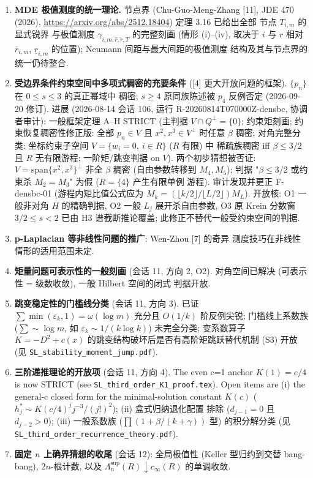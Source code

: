 \documentclass[UTF8]{ctexart}
\begin{document}
\begin{enumerate}
		$q\ge0$ (Gan-Zheng-Li-Shao 线 [8]) 与变号权重的最优常数与极值
		结构仍待确定.
	\item \textbf{MDE 极值测度的统一理论.}
		节点界 (Chu-Guo-Meng-Zhang [11], JDE 470 (2026),
		\url{https://arxiv.org/abs/2512.18404}) 定理 3.16 已给出全部
		节点 $T_{i,m}$ 的显式锐界
		与极值测度 $\gamma_{i,m,\hat r,\check r,T}$ 的完整刻画
		(情形 (i)--(iv), 取决于 $i$ 与 $r$ 相对 $\overline r_{i,m}$,
		$\underline r_{i,m}$ 的位置); Neumann 间距与最大间距的极值测度
		结构及其与节点界的统一仍待整合.
	\item \textbf{受边界条件约束空间中多项式稠密的充要条件}
		([4] 更大开放问题的框架). $\{p_n\}$ 在 $0\le s\le3$ 的真正幂域中
		稠密; $s\ge4$ 原同族陈述被 $p_4$ 反例否定 (2026-09-20 修订). 进展 (2026-08-14 会话 106, 运行
		R-20260814T070000Z-densbc, 协调者审计): 一般框架定理 A--H STRICT
		(主判据 $V\cap Q^\perp=\{0\}$; 约束矩刻画; 约束恢复稠密性修正版:
		全部 $p_n\in V$ 且 $x^2,x^3\in V^\perp$ 时任意 $\beta$ 稠密;
		对角完整分类: 坐标约束子空间 $V=\{w_i=0,\ i\in R\}$ ($R$ 有限) 中
		稀疏族稠密 iff $\beta\le3/2$ 且 $R$ 无有限游程; 一阶矩/跳变判据
		on $V$). 两个初步猜想被否证: $V=\mathrm{span}\{x^2,x^3\}^\perp$
		非全 $\beta$ 稠密 (自由参数转移到 $M_4,M_5$); 判据
		"$\beta\le3/2$ 或约束杀 $M_2=M_3$" 为假 ($R=\{4\}$ 产生有限单例
		游程). 审计发现并更正 F-densbc-01 (游程内矩比值公式应为
		$M_k=(\lfloor k/2\rfloor/\lfloor L/2\rfloor)M_L$). 开放核:
		O1 一般非对角 $H$ 的精确判据, O2 一般 $L_j$ 展开杀自由参数,
		O3 原 Krein 分数窗 $3/2\le s<2$ 已由 H3 谱截断推论覆盖; 此修正不替代一般受约束空间的判据.
	\item \textbf{p-Laplacian 等非线性问题的推广}: Wen-Zhou [7] 的奇异
		测度技巧在非线性情形的适用范围未定.
	\item \textbf{矩量问题可表示性的一般刻画} (会话 11, 方向 2, O2).
		对角空间已解决 (可表示性 = 级数收敛), 一般 Hilbert 空间的闭式
		判据开放.
	\item \textbf{跳变稳定性的门槛线分类} (会话 11, 方向 3).
		已证 $\sum\min(\varepsilon_k,1) = \omega(\log m)$ 充分且 $O(1/k)$
		阶反例尖锐; 门槛线上系数族 ($\sum\sim\log m$, 如
		$\varepsilon_k\sim1/(k\log k)$) 未完全分类; 变系数算子
		$K = -D^2 + c(x)$ 的跳变结构破坏后是否有高阶矩跳跃替代机制
		(S3) 开放 (见 \texttt{SL\_stability\_moment\_jump.pdf}).
	\item \textbf{三阶递推理论的开放项} (会话 11, 方向 4).
		The even c=1 anchor $K(1)=e/4$ is now STRICT (see
		\texttt{SL\_third\_order\_K1\_proof.tex}). Open items are (i) the
		general-c closed form for the minimal-solution constant $K(c)$
		($h^*_j \sim K(c/4)^j j^{-3}/(j!)^2$); (ii) 盒式归纳退化配置
		排除 ($d_{j-1}=0$ 且 $d_{j-2}>0$); (iii) 一般系数族
		($\prod(1+\beta/(k+\gamma))$ 型) 的积分解分类
		(见 \texttt{SL\_third\_order\_recurrence\_theory.pdf}).
	\item \textbf{固定 $n$ 上确界猜想的收尾} (会话 12): 全局极值性
		(Keller 型归约到交替 bang-bang), $2n$-根计数, 以及
		$\Lambda_n^{\sup}(R)\downarrow c_\infty(R)$ 的单调收敛.
\end{enumerate}
\end{document}
